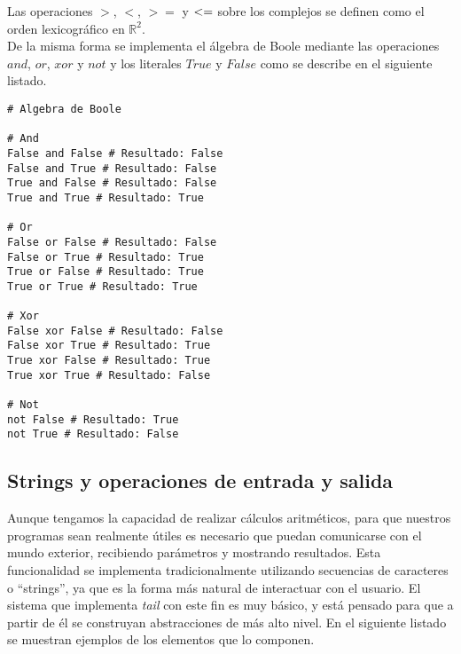 Las operaciones $>$, $<$, $>=$ y $\mathligsoff <=$ sobre los complejos se definen como el orden lexicográfico en $\mathbb{R}^2$.\\

De la misma forma se implementa el álgebra de Boole mediante las operaciones $and$, $or$, $xor$ y $not$ y los literales $True$ y $False$ como se describe en el siguiente listado.

\begin{lstlisting}[style=tail, caption={Operaciones booleanas}]
# Algebra de Boole

# And
False and False # Resultado: False
False and True # Resultado: False
True and False # Resultado: False
True and True # Resultado: True

# Or
False or False # Resultado: False
False or True # Resultado: True
True or False # Resultado: True
True or True # Resultado: True

# Xor
False xor False # Resultado: False
False xor True # Resultado: True
True xor False # Resultado: True
True xor True # Resultado: False

# Not
not False # Resultado: True
not True # Resultado: False
\end{lstlisting}

\subsection{Strings y operaciones de entrada y salida}

Aunque tengamos la capacidad de realizar cálculos aritméticos, para que nuestros programas sean realmente útiles es necesario que puedan comunicarse con el mundo exterior, recibiendo parámetros y mostrando resultados. Esta funcionalidad se implementa tradicionalmente utilizando secuencias de caracteres o ``strings'', ya que es la forma más natural de interactuar con el usuario. El sistema que implementa \textit{tail} con este fin es muy básico, y está pensado para que a partir de él se construyan abstracciones de más alto nivel. En el siguiente listado se muestran ejemplos de los elementos que lo componen. 

